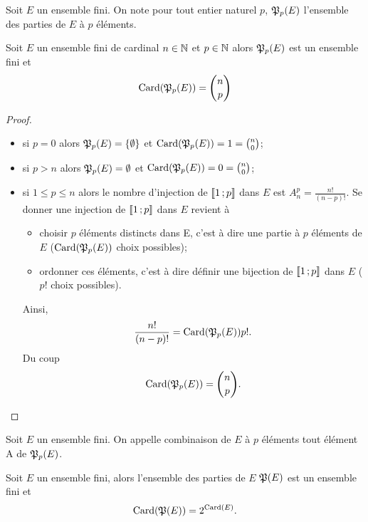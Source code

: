 Soit \(E\) un ensemble fini. On note pour tout entier naturel \(p\), \(\mathfrak{P}_p(E)\) l'ensemble des parties de \(E\) à \(p\) éléments.
\begin{prop}\label{prop:ppartiesfinies}
  Soit \(E\) un ensemble fini de cardinal \(n\in \mathbb{N}\) et \(p \in \mathbb{N}\) alors \(\mathfrak{P}_p(E)\) est un ensemble fini et
  \begin{equation}
    \operatorname{Card}(\mathfrak{P}_p(E))=\binom{n}{p}
  \end{equation}
\end{prop}
\begin{proof}
  \begin{itemize}
  \item si \(p=0\) alors \(\mathfrak{P}_p(E)=\{\emptyset\}\) et \(\operatorname{Card}(\mathfrak{P}_p(E))=1=\binom{n}{0}\);
  \item si \(p>n\) alors \(\mathfrak{P}_p(E)=\emptyset\) et \(\operatorname{Card}(\mathfrak{P}_p(E))=0=\binom{n}{0}\);
  \item si \(1\leqslant p \leqslant n\) alors le nombre d'injection de \(\mathopen{\llbracket}1\mathclose{}\mathpunct{};p\mathclose{\rrbracket}\) dans \(E\) est \(A_{n}^p=\frac{n!}{(n-p)!}\). Se donner une injection de  \(\mathopen{\llbracket}1\mathclose{}\mathpunct{};p\mathclose{\rrbracket}\) dans \(E\) revient à
    \begin{itemize}
    \item choisir \(p\) éléments distincts dans E, c'est à dire une partie à \(p\) éléments de \(E\) (\(\operatorname{Card}(\mathfrak{P}_p(E))\) choix possibles);
    \item ordonner ces éléments, c'est à dire définir une bijection de \(\mathopen{\llbracket}1\mathclose{}\mathpunct{};p\mathclose{\rrbracket}\) dans \(E\) (\(p!\) choix possibles).
    \end{itemize}
    Ainsi,
    \begin{equation}
      \frac{n!}{(n-p)!}=\operatorname{Card}(\mathfrak{P}_p(E)) p!.
    \end{equation}
    Du coup
    \begin{equation}
      \operatorname{Card}(\mathfrak{P}_p(E))=\binom{n}{p}.
    \end{equation}
  \end{itemize}
\end{proof}
\begin{defdef}
  Soit \(E\) un ensemble fini. On appelle combinaison de \(E\) à \(p\) éléments tout élément A de \(\mathfrak{P}_p(E)\).
\end{defdef}
\begin{prop}
  Soit \(E\) un ensemble fini, alors l'ensemble des parties de \(E\) \(\mathfrak{P}(E)\) est un ensemble fini et
  \begin{equation}
    \operatorname{Card}(\mathfrak{P}(E))=2^{\operatorname{Card}(E)}.
  \end{equation}
\end{prop}
